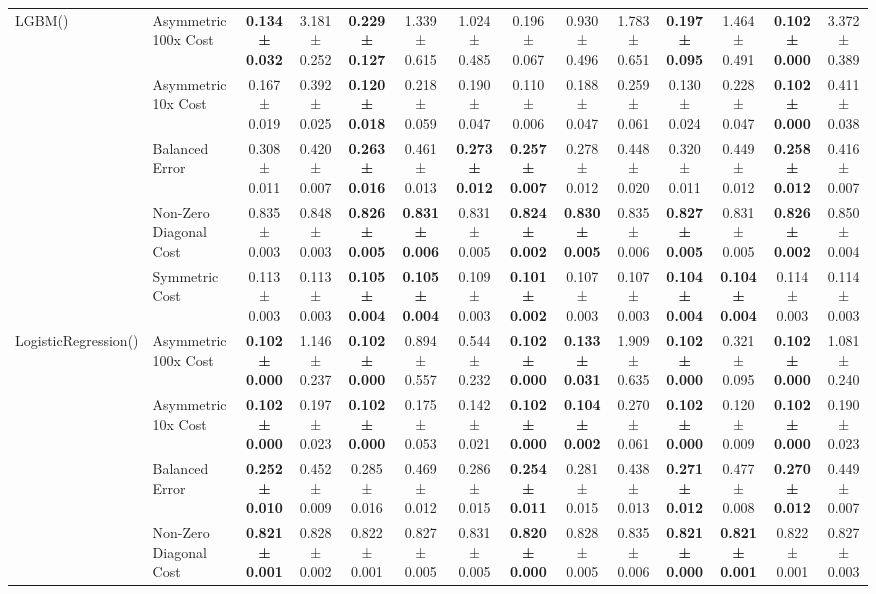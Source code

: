 \begin{table}[H]
{\begin{tabular}{llcccccccccccc}
\cline{1-14}
\multirow[t]{5}{*}{LGBM()} & Asymmetric 100x Cost & \textbf{0.134 ± 0.032} & 3.181 ± 0.252 & \textbf{0.229 ± 0.127} & 1.339 ± 0.615 & 1.024 ± 0.485 & 0.196 ± 0.067 & 0.930 ± 0.496 & 1.783 ± 0.651 & \textbf{0.197 ± 0.095} & 1.464 ± 0.491 & \textbf{0.102 ± 0.000} & 3.372 ± 0.389 \\
 & Asymmetric 10x Cost & 0.167 ± 0.019 & 0.392 ± 0.025 & \textbf{0.120 ± 0.018} & 0.218 ± 0.059 & 0.190 ± 0.047 & 0.110 ± 0.006 & 0.188 ± 0.047 & 0.259 ± 0.061 & 0.130 ± 0.024 & 0.228 ± 0.047 & \textbf{0.102 ± 0.000} & 0.411 ± 0.038 \\
 & Balanced Error & 0.308 ± 0.011 & 0.420 ± 0.007 & \textbf{0.263 ± 0.016} & 0.461 ± 0.013 & \textbf{0.273 ± 0.012} & \textbf{0.257 ± 0.007} & 0.278 ± 0.012 & 0.448 ± 0.020 & 0.320 ± 0.011 & 0.449 ± 0.012 & \textbf{0.258 ± 0.012} & 0.416 ± 0.007 \\
 & Non-Zero Diagonal Cost & 0.835 ± 0.003 & 0.848 ± 0.003 & \textbf{0.826 ± 0.005} & \textbf{0.831 ± 0.006} & 0.831 ± 0.005 & \textbf{0.824 ± 0.002} & \textbf{0.830 ± 0.005} & 0.835 ± 0.006 & \textbf{0.827 ± 0.005} & 0.831 ± 0.005 & \textbf{0.826 ± 0.002} & 0.850 ± 0.004 \\
 & Symmetric Cost & 0.113 ± 0.003 & 0.113 ± 0.003 & \textbf{0.105 ± 0.004} & \textbf{0.105 ± 0.004} & 0.109 ± 0.003 & \textbf{0.101 ± 0.002} & 0.107 ± 0.003 & 0.107 ± 0.003 & \textbf{0.104 ± 0.004} & \textbf{0.104 ± 0.004} & 0.114 ± 0.003 & 0.114 ± 0.003 \\
\cline{1-14}
\multirow[t]{5}{*}{LogisticRegression()} & Asymmetric 100x Cost & \textbf{0.102 ± 0.000} & 1.146 ± 0.237 & \textbf{0.102 ± 0.000} & 0.894 ± 0.557 & 0.544 ± 0.232 & \textbf{0.102 ± 0.000} & \textbf{0.133 ± 0.031} & 1.909 ± 0.635 & \textbf{0.102 ± 0.000} & 0.321 ± 0.095 & \textbf{0.102 ± 0.000} & 1.081 ± 0.240 \\
 & Asymmetric 10x Cost & \textbf{0.102 ± 0.000} & 0.197 ± 0.023 & \textbf{0.102 ± 0.000} & 0.175 ± 0.053 & 0.142 ± 0.021 & \textbf{0.102 ± 0.000} & \textbf{0.104 ± 0.002} & 0.270 ± 0.061 & \textbf{0.102 ± 0.000} & 0.120 ± 0.009 & \textbf{0.102 ± 0.000} & 0.190 ± 0.023 \\
 & Balanced Error & \textbf{0.252 ± 0.010} & 0.452 ± 0.009 & 0.285 ± 0.016 & 0.469 ± 0.012 & 0.286 ± 0.015 & \textbf{0.254 ± 0.011} & 0.281 ± 0.015 & 0.438 ± 0.013 & \textbf{0.271 ± 0.012} & 0.477 ± 0.008 & \textbf{0.270 ± 0.012} & 0.449 ± 0.007 \\
 & Non-Zero Diagonal Cost & \textbf{0.821 ± 0.001} & 0.828 ± 0.002 & 0.822 ± 0.001 & 0.827 ± 0.005 & 0.831 ± 0.005 & \textbf{0.820 ± 0.000} & 0.828 ± 0.005 & 0.835 ± 0.006 & \textbf{0.821 ± 0.000} & \textbf{0.821 ± 0.001} & 0.822 ± 0.001 & 0.827 ± 0.003 \\

\end{tabular}}
\end{table}
